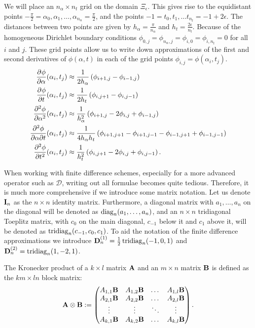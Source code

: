 We will place an $n_\alpha \times n_t$ grid on the domain $\Xi_\epsilon$. This gives rise to the equidistant points $-\frac{\pi}{2}=\alpha_0, \alpha_1, \dots, \alpha_{n_\alpha} = \frac{\pi}{2}$, and the points $-1 = t_0, t_1, \dots t_{n_t} = -1 + 2\epsilon$. The distances between two points are given by $h_\alpha = \frac{\pi}{n_\alpha}$ and $h_t = \frac{2\epsilon}{n_t}$. Because of the homogeneous Dirichlet boundary conditions $\phi_{0,j} = \phi_{n_\alpha,j} = \phi_{i, 0} = \phi_{i,n_t} = 0$ for all $i$ and $j$. These grid points allow us to write down approximations of the first and second derivatives of $\phi(\alpha, t)$ in each of the grid points $\phi_{i, j} = \phi(\alpha_i, t_j)$.
\begin{align*}
  {\pdv[]{\phi}{\alpha}}(\alpha_i, t_j)    & \approx \frac{1}{2h_\alpha}\left( \phi_{i+1,j} - \phi_{i-1,j} \right)                                           \\
  {\pdv[]{\phi}{t}}(\alpha_i, t_j)         & \approx \frac{1}{2h_t}\left( \phi_{i,j+1} - \phi_{i,j-1} \right)                                                \\
  {\pdv[2]{\phi}{\alpha}}(\alpha_i, t_j)   & \approx \frac{1}{h_\alpha^2}\left( \phi_{i+1,j} - 2 \phi_{i,j} + \phi_{i-1,j} \right)                           \\
  {\pdv[]{\phi}{\alpha}{t}}(\alpha_i, t_j) & \approx \frac{1}{4h_\alpha h_t}\left( \phi_{i+1,j+1} - \phi_{i+1,j-1} - \phi_{i-1,j+1} + \phi_{i-1,j-1} \right) \\
  {\pdv[2]{\phi}{t}}(\alpha_i, t_j)        & \approx \frac{1}{h_t^2}\left( \phi_{i,j+1} - 2 \phi_{i,j} + \phi_{i,j-1} \right)\text{.}
\end{align*}

When working with finite difference schemes, especially for a more  advanced operator such as $\mathcal{D}$, writing out all formulae becomes quite tedious. Therefore, it is much more comprehensive if we introduce some matrix notation. Let us denote $\vb{I}_n$ as the $n \times n$ identity matrix. Furthermore, a diagonal matrix with $a_1, \dots, a_n$ on the diagonal will be denoted as $\operatorname{diag}_n(a_1, \dots, a_n)$, and an $n \times n$ tridiagonal Toeplitz matrix, with $c_{0}$ on the main diagonal, $c_{-1}$ below it and $c_1$ above it, will be denoted as $\operatorname{tridiag}_{n}(c_{-1}, c_{0}, c_1)$. To aid the notation of the finite difference approximations we introduce $\vb{D}^{(1)}_n = \frac{1}{2}\operatorname{tridiag}_n(-1,0,1)$ and $\vb{D}^{(2)}_n = \operatorname{tridiag}_n(1,-2,1)$.

The Kronecker product of a $k \times l$ matrix $\vb{A}$ and an $m \times n$ matrix $\vb{B}$ is defined as the $km \times ln$ block matrix:
$$
  \vb{A} \otimes \vb{B} := \begin{pmatrix}
    A_{1,1} \vb{B} & A_{1, 2} \vb{B} & \dots  & A_{1, l} \vb{B} \\
    A_{2,1} \vb{B} & A_{2, 2} \vb{B} & \dots  & A_{2, l} \vb{B} \\
    \vdots         & \vdots          & \ddots & \vdots          \\
    A_{k,1} \vb{B} & A_{k, 2} \vb{B} & \dots  & A_{k, l} \vb{B}
  \end{pmatrix}{}\text{.}
$$

